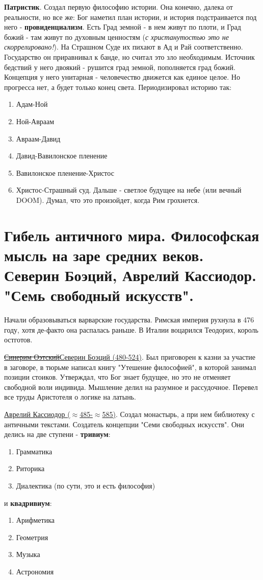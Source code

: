 \textbf{Патристик}. Создал первую философию истории. Она конечно, далека от реальности, но все же: Бог наметил план истории, и история подстраивается под него - \textbf{провиденциализм}. Есть Град земной - в нем живут по плоти, и Град божий - там живут по духовным ценностям (\textit{с христанутостью это не скоррелировано!}). На Страшном Суде их пихают в Ад и Рай соответственно. Государство он приравнивал к банде, но считал это зло необходимым. Источник бедствий у него двоякий - рушится град земной, пополняется град божий. Концепция у него унитарная - человечество движется как единое целое. Но прогресса нет, а будет только конец света. Периодизировал историю так:
\begin{enumerate}
\item Адам-Ной
\item Ной-Авраам
\item Авраам-Давид
\item Давид-Вавилонское пленение
\item Вавилонское пленение-Христос
\item Христос-Страшный суд. Дальше - светлое будущее на небе (или вечный DOOM). Думал, что это произойдет, когда Рим грохнется.
\end{enumerate}


\section{Гибель античного мира. Философская мысль на заре средних веков. Северин Боэций, Аврелий Кассиодор. "Семь свободный искусств". }
Начали образовываться варварские государства. Римская империя рухнула в 476 году, хотя де-факто она распалась раньше. В Италии воцарился Теодорих, король остготов. 

\underline{\sout{Синерим Оэтский}Северин Боэций (480-524)}. Был приговорен к казни за участие в заговоре, в тюрьме написал книгу "Утешение философией", в которой занимал позиции стоиков. Утверждал, что Бог знает будущее, но это не отменяет свободной воли индивида. Мышление делил на разумное и рассудочное. Перевел все труды Аристотеля о логике на латынь.

\underline{Аврелий Кассиодор ($\approx$485-$\approx$585)}. Создал монастырь, а при нем библиотеку с античными текстами. Создатель концепции "Семи свободных искусств". Они делись на две ступени -  \textbf{тривиум}:
\begin{enumerate}
\item Грамматика
\item Риторика
\item Диалектика (по сути, это и есть философия)
\end{enumerate}
и \textbf{квадривиум}:
\begin{enumerate}
\item Арифметика
\item Геометрия
\item Музыка
\item Астрономия
\end{enumerate}

